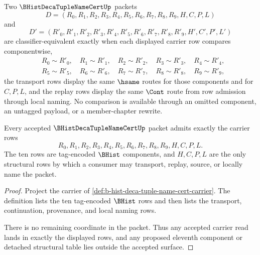 \begin{definition}
\label{def:b-hist-deca-tuple-name-cert-classifier}
Two $\BHistDecaTupleNameCertUp$ packets
$$
D=(R_0,R_1,R_2,R_3,R_4,R_5,R_6,R_7,R_8,R_9,H,C,P,L)
$$
and
$$
D'=(R'_0,R'_1,R'_2,R'_3,R'_4,R'_5,R'_6,R'_7,R'_8,R'_9,H',C',P',L')
$$
are classifier-equivalent exactly when each displayed carrier row compares componentwise,
$$
\begin{aligned}
&R_0 \sim R'_0,\quad R_1 \sim R'_1,\quad R_2 \sim R'_2,\quad R_3 \sim R'_3,\quad R_4 \sim R'_4,\\
&R_5 \sim R'_5,\quad R_6 \sim R'_6,\quad R_7 \sim R'_7,\quad R_8 \sim R'_8,\quad R_9 \sim R'_9,
\end{aligned}
$$
the transport rows display the same $\hsame$ routes for those components and for $C,P,L$, and the replay rows display the same $\Cont$ route from row admission through local naming. No comparison is available through an omitted component, an untagged payload, or a member-chapter rewrite.
\end{definition}

\begin{theorem}
\label{thm:b-hist-deca-tuple-name-cert-carrier-admission}
Every accepted $\BHistDecaTupleNameCertUp$ packet admits exactly the carrier rows
$$
R_0,R_1,R_2,R_3,R_4,R_5,R_6,R_7,R_8,R_9,H,C,P,L.
$$
The ten rows are tag-encoded $\BHist$ components, and $H,C,P,L$ are the only structural rows by which a consumer may transport, replay, source, or locally name the packet.
\end{theorem}
\begin{proof}
Project the carrier of \autoref{def:b-hist-deca-tuple-name-cert-carrier}. The definition lists the ten tag-encoded $\BHist$ rows and then lists the transport, continuation, provenance, and local naming rows.

There is no remaining coordinate in the packet. Thus any accepted carrier read lands in exactly the displayed rows, and any proposed eleventh component or detached structural table lies outside the accepted surface.
\end{proof}

